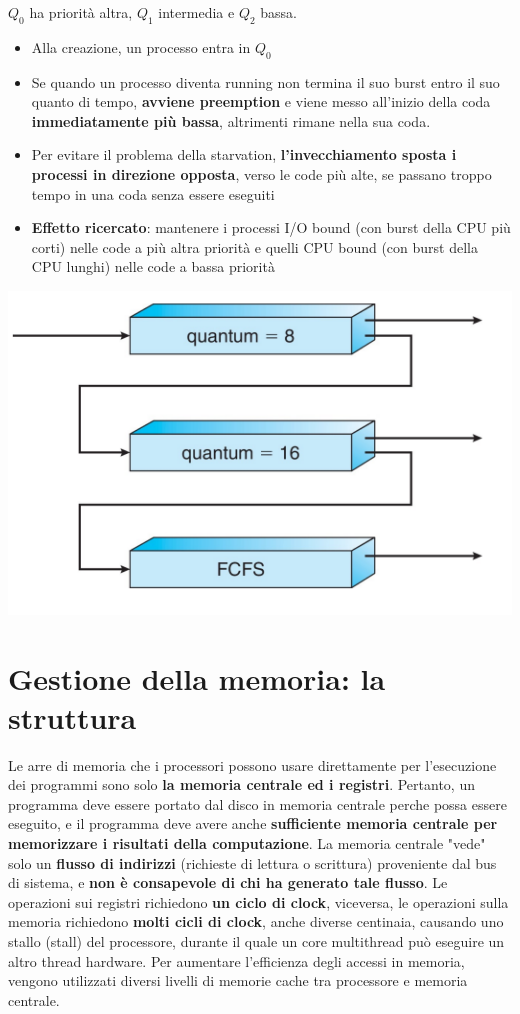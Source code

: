 \documentclass[12pt]{article}
\begin{document}
$Q_0$ ha priorità altra, $Q_1$ intermedia e $Q_2$ bassa.
\begin{itemize}
    \item Alla creazione, un processo entra in $Q_0$
    \item Se quando un processo diventa running non termina il suo burst entro il suo quanto di tempo, \textbf{avviene preemption} e viene messo all'inizio della coda \textbf{immediatamente più bassa}, altrimenti rimane nella sua coda.
    \item Per evitare il problema della starvation, \textbf{l'invecchiamento sposta i processi in direzione opposta}, verso le code più alte, se passano troppo tempo in una coda senza essere eseguiti
    \item \textbf{Effetto ricercato}: mantenere i processi I/O bound (con burst della CPU più corti) nelle code a più altra priorità e quelli CPU bound (con burst della CPU lunghi) nelle code a bassa priorità
\end{itemize}
\begin{center}
    \includegraphics[width = 0.50\linewidth]{Images/52.png}
\end{center}
\section{Gestione della memoria: la struttura}
Le arre di memoria che i processori possono usare direttamente per l'esecuzione dei programmi sono solo \textbf{la memoria centrale ed i registri}.
Pertanto, un programma deve essere portato dal disco in memoria centrale perche possa essere eseguito, e il programma deve avere anche \textbf{sufficiente memoria centrale per memorizzare i risultati della computazione}.
La memoria centrale "vede" solo un \textbf{flusso di indirizzi} (richieste di lettura o scrittura) proveniente dal bus di sistema, e \textbf{non è consapevole di chi ha generato tale flusso}.
Le operazioni sui registri richiedono \textbf{un ciclo di clock}, viceversa, le operazioni sulla memoria richiedono \textbf{molti cicli di clock}, anche diverse centinaia, causando uno stallo (stall) del processore, durante il quale
un core multithread può eseguire un altro thread hardware.
Per aumentare l'efficienza degli accessi in memoria, vengono utilizzati diversi livelli di memorie cache tra processore e memoria centrale.
\end{document}
